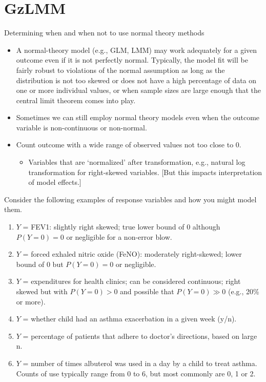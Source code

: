 \documentclass[
  9pt,
  ignorenonframetext,
]{beamer}
\providecommand{\tightlist}{%
  \setlength{\itemsep}{0pt}\setlength{\parskip}{0pt}}
\begin{document}
\hypertarget{gzlmm}{%
\section{GzLMM}\label{gzlmm}}

\begin{frame}{Determining when and when not to use normal theory
methods}
\protect\hypertarget{determining-when-and-when-not-to-use-normal-theory-methods}{}
\begin{itemize}
\item
  A normal-theory model (e.g., GLM, LMM) may work adequately for a given
  outcome even if it is not perfectly normal. Typically, the model fit
  will be fairly robust to violations of the normal assumption as long
  as the distribution is not too skewed or does not have a high
  percentage of data on one or more individual values, or when sample
  sizes are large enough that the central limit theorem comes into play.
\item
  Sometimes we can still employ normal theory models even when the
  outcome variable is non-continuous or non-normal.
\item
  Count outcome with a wide range of observed values not too close to 0.

  \begin{itemize}
  \tightlist
  \item
    Variables that are `normalized' after transformation, e.g., natural
    log transformation for right-skewed variables. {[}But this impacts
    interpretation of model effects.{]}
  \end{itemize}
\end{itemize}
\end{frame}

\begin{frame}{Consider the following examples of response variables and
how you might model them.}
\protect\hypertarget{consider-the-following-examples-of-response-variables-and-how-you-might-model-them.}{}
\begin{enumerate}
\item
  \(Y\) = FEV1: slightly right skewed; true lower bound of 0 although
  \(P(Y=0)=0\) or negligible for a non-error blow.
\item
  \(Y\) = forced exhaled nitric oxide (FeNO): moderately right-skewed;
  lower bound of 0 but \(P(Y=0)=0\) or negligible.
\item
  \(Y\) = expenditures for health clinics; can be considered continuous;
  right skewed but with \(P(Y=0)>0\) and possible that \(P(Y=0)\gg 0\)
  (e.g., 20\% or more).
\item
  \(Y\) = whether child had an asthma exacerbation in a given week
  (y/n).
\item
  \(Y\) = percentage of patients that adhere to doctor's directions,
  based on large n.
\item
  \(Y\) = number of times albuterol was used in a day by a child to
  treat asthma. Counts of use typically range from 0 to 6, but most
  commonly are 0, 1 or 2.
\end{enumerate}
\end{frame}
\end{document}
